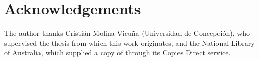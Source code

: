 \section*{Acknowledgements}
The author thanks Cristián Molina Vicuña (Universidad de Concepción), who supervised the
thesis from which this work originates, and the National Library of Australia, which
supplied a copy of \citet{harrison1989} through its Copies Direct service.
